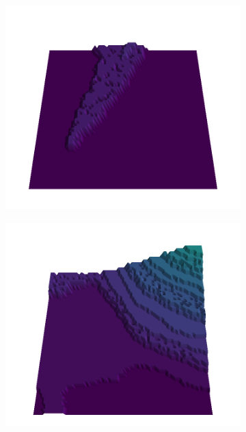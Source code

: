 \begin{figure}[H]
    \begin{subfigure}[b]{0.19\textwidth}
        \includegraphics[width=\linewidth]{../img/5/quarry/false_positive//patch-3d-majavi-colormap-0.png}
    \end{subfigure}
    \begin{subfigure}[b]{0.19\textwidth}
        \includegraphics[width=\linewidth]{../img/5/quarry/false_positive//patch-3d-majavi-colormap-1.png}
    \end{subfigure}  

\end{figure}
